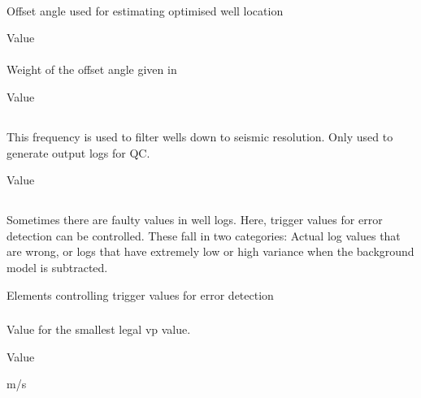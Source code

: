 \paragraph{}
 \slist
    \item \Description Offset angle used for estimating optimised well location
    \item \Argument Value
    \item \Default
 \elist

\paragraph{}
 \slist
    \item \Description Weight of the offset angle given in 
    \item \Argument Value
    \item {}
 \elist

\subsection{}
 \slist
   \item \Description This frequency is used to filter wells down to seismic resolution. Only used to generate output logs for QC.
   \item \Argument Value
   \item \Default
 \elist

\subsection{}
 \slist
   \item \Description Sometimes there are faulty values in well logs. Here, trigger values for error detection can be controlled. These fall in two categories: Actual log values that are wrong, or logs that have extremely low or high variance when the background model is subtracted.
   \item \Argument Elements controlling trigger values for error detection
   \item \Default
 \elist

\subsubsection{}
 \slist
   \item \Description Value for the smallest legal vp value.
   \item \Argument Value
   \item {} m/s
 \elist

